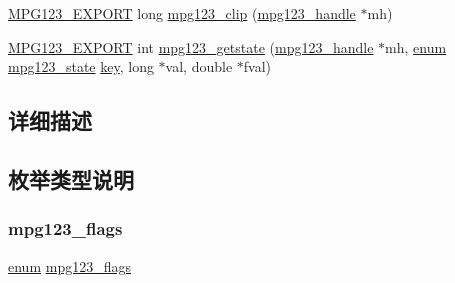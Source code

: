 \begin{DoxyCompactItemize}
\item 
\hyperlink{mpg123_8h_a2ba98cfba3f760879df70e755b2a61cc}{M\+P\+G123\+\_\+\+E\+X\+P\+O\+RT} long \hyperlink{group__mpg123__status_gadb294b6e7c73dc58190b6fa2f024042d}{mpg123\+\_\+clip} (\hyperlink{group__mpg123__init_ga6728e2839a395f3a07d4514da659faca}{mpg123\+\_\+handle} $\ast$mh)
\item 
\hyperlink{mpg123_8h_a2ba98cfba3f760879df70e755b2a61cc}{M\+P\+G123\+\_\+\+E\+X\+P\+O\+RT} int \hyperlink{group__mpg123__status_gaf8d11409b86657b19069bbffb4c22fb7}{mpg123\+\_\+getstate} (\hyperlink{group__mpg123__init_ga6728e2839a395f3a07d4514da659faca}{mpg123\+\_\+handle} $\ast$mh, \hyperlink{interfaceenum}{enum} \hyperlink{group__mpg123__status_gadfc90f3072f8c1fe32dd88854f6afb28}{mpg123\+\_\+state} \hyperlink{structkey}{key}, long $\ast$val, double $\ast$fval)
\end{DoxyCompactItemize}


\subsection{详细描述}


\subsection{枚举类型说明}
\mbox{\label{group__mpg123__status_gaf527c5a99203cb8591b0e0dfb2615303}} 
\subsubsection{\texorpdfstring{mpg123\+\_\+flags}{mpg123\_flags}}
{\footnotesize\ttfamily \hyperlink{interfaceenum}{enum} \hyperlink{group__mpg123__status_gaf527c5a99203cb8591b0e0dfb2615303}{mpg123\+\_\+flags}}

